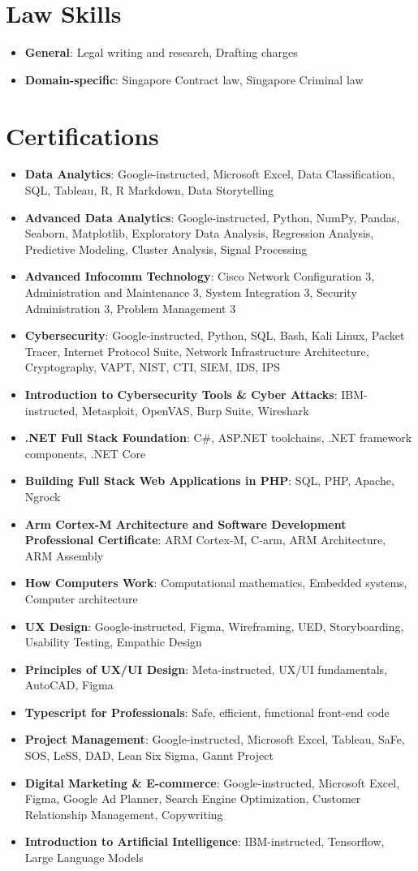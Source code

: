 \documentclass[letterpaper,11pt]{article}
\newcommand{\resumeItem}[2]{
  \item\small{
    \textbf{#1}{: #2 \vspace{-2pt}}
  }
}
\newcommand{\resumeSubItem}[2]{\resumeItem{#1}{#2}\vspace{-4pt}}
\newcommand{\resumeSubHeadingListStart}{\begin{itemize}[leftmargin=*]}
\newcommand{\resumeSubHeadingListEnd}{\end{itemize}}
\begin{document}
 \section{Law Skills}
 \resumeSubHeadingListStart
   \resumeSubItem{General}
      {Legal writing and research, Drafting charges}
   \resumeSubItem{Domain-specific}
      {Singapore Contract law, Singapore Criminal law}
 \resumeSubHeadingListEnd


\section{Certifications}
 \resumeSubHeadingListStart
    \resumeSubItem{Data Analytics}
        {Google-instructed, Microsoft Excel, Data Classification, SQL, Tableau, R, R Markdown, Data Storytelling}
    \resumeSubItem{Advanced Data Analytics}
        {Google-instructed, Python, NumPy, Pandas, Seaborn, Matplotlib, Exploratory Data Analysis, Regression Analysis, Predictive Modeling, Cluster Analysis, Signal Processing}
    \resumeSubItem{Advanced Infocomm Technology}
        {Cisco Network Configuration 3, Administration and Maintenance 3, System Integration 3, Security Administration 3, Problem Management 3}
    \resumeSubItem{Cybersecurity}
        {Google-instructed, Python, SQL, Bash, Kali Linux, Packet Tracer, Internet Protocol Suite, Network Infrastructure Architecture, Cryptography, VAPT, NIST, CTI, SIEM, IDS, IPS}
    \resumeSubItem{Introduction to Cybersecurity Tools \& Cyber Attacks}
        {IBM-instructed, Metasploit, OpenVAS, Burp Suite, Wireshark}
    \resumeSubItem{.NET Full Stack Foundation}
        {C\#, ASP.NET toolchains, .NET framework components, .NET Core}
    \resumeSubItem{Building Full Stack Web Applications in PHP}
        {SQL, PHP, Apache, Ngrock}
    \resumeSubItem{Arm Cortex-M Architecture and Software Development Professional Certificate}
        {ARM Cortex-M, C-arm, ARM Architecture, ARM Assembly}
    \resumeSubItem{How Computers Work}
        {Computational mathematics, Embedded systems, Computer architecture}
    \resumeSubItem{UX Design}
        {Google-instructed, Figma, Wireframing, UED, Storyboarding, Usability Testing, Empathic Design}
    \resumeSubItem{Principles of UX/UI Design}
        {Meta-instructed, UX/UI fundamentals, AutoCAD, Figma}
    \resumeSubItem{Typescript for Professionals}
        {Safe, efficient, functional front-end code}
    \resumeSubItem{Project Management}
        {Google-instructed, Microsoft Excel, Tableau, SaFe, SOS, LeSS, DAD, Lean Six Sigma, Gannt Project}
    \resumeSubItem{Digital Marketing \& E-commerce}
        {Google-instructed, Microsoft Excel, Figma, Google Ad Planner, Search Engine Optimization, Customer Relationship Management, Copywriting}
    \resumeSubItem{Introduction to Artificial Intelligence}
        {IBM-instructed, Tensorflow, Large Language Models}
 \resumeSubHeadingListEnd
 
\end{document}
